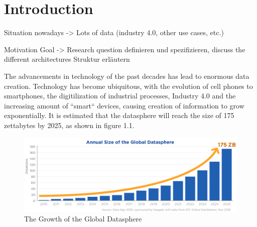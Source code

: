 \chapter{Introduction}
\label{cha:Introduction} %
Situation nowadays -> Lots of data (industry 4.0, other use cases, etc.)

Motivation
Goal -> Research question definieren und spezifizieren, discuss the different architectures
Struktur erläutern

The advancements in technology of the past decades has lead to enormous data creation. Technology has become ubiquitous, 
with the evolution of cell phones to smartphones, the digitilization of industrial processes, Industry 4.0
and the increasing amount of ``smart`` devices, causing creation of information to grow exponentially.
It is estimated that the \gls{datasphere} will reach the size of 175 zettabytes by 2025, as shown in figure 1.1.
\begin{figure}[ht]
\centering
\includegraphics[width=1.0\textwidth]{Bilder/size_global_datasphere.png}
\caption{The Growth of the Global Datasphere \cite[p.6]{idc-seagate-data}}
\label{fig:growth_datasphere}
\end{figure}

